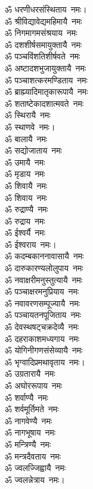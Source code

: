 \begin{multicols}{2}
\begin{flushleft}
ॐ धरणीधरसंस्थिताय~नमः।\hfill{}\\
ॐ श्रीविद्यावेद्यमहिमायै~नमः\\
ॐ निगमागमसंश्रयाय~नमः\\
ॐ दशशीर्षसमायुक्तायै~नमः\\
ॐ पञ्चविंशतिशीर्षवते~नमः\\
ॐ अष्टादशभुजायुक्तायै~नमः\\
ॐ पञ्चाशत्करमण्डिताय~नमः\\
ॐ ब्राह्म्यादिमातृकारूपायै~नमः\\
ॐ शताष्टेकादशात्मवते~नमः\\
ॐ स्थिरायै~नमः\\
ॐ स्थाणवे~नमः।\hfill{}\\
ॐ बालायै~नमः\\
ॐ सद्योजाताय~नमः\\
ॐ उमायै~नमः\\
ॐ मृडाय~नमः\\
ॐ शिवायै~नमः\\
ॐ शिवाय~नमः\\
ॐ रुद्राण्यै~नमः\\
ॐ रुद्राय~नमः\\
ॐ ईश्वर्यै~नमः\\
ॐ ईश्वराय~नमः।\hfill{}\\
ॐ कदम्बकाननावासायै~नमः\\
ॐ दारुकारण्यलोलुपाय~नमः\\
ॐ नवाक्षरीमनुस्तुत्यायै~नमः\\
ॐ पञ्चाक्षरमनुप्रियाय~नमः\\
ॐ नवावरणसम्पूज्यायै~नमः\\
ॐ पञ्चायतनपूजिताय~नमः\\
ॐ देवस्थषट्चक्रदेव्यै~नमः\\
ॐ दहराकाशमध्यगाय~नमः\\
ॐ योगिनीगणसंसेव्यायै~नमः\\
ॐ भृग्वादिप्रमथावृताय~नमः।\hfill{}\\
ॐ उग्रतारायै~नमः\\
ॐ अघोररूपाय~नमः\\
ॐ शर्वाण्यै~नमः\\
ॐ शर्वमूर्तिमते~नमः\\
ॐ नागवेण्यै~नमः\\
ॐ नागभूषाय~नमः\\
ॐ मन्त्रिण्यै~नमः\\
ॐ मन्त्रदैवताय~नमः\\
ॐ ज्वलज्जिह्वायै~नमः\\
ॐ ज्वलन्नेत्राय~नमः।\hfill{}\\

\end{flushleft}
\end{multicols}
